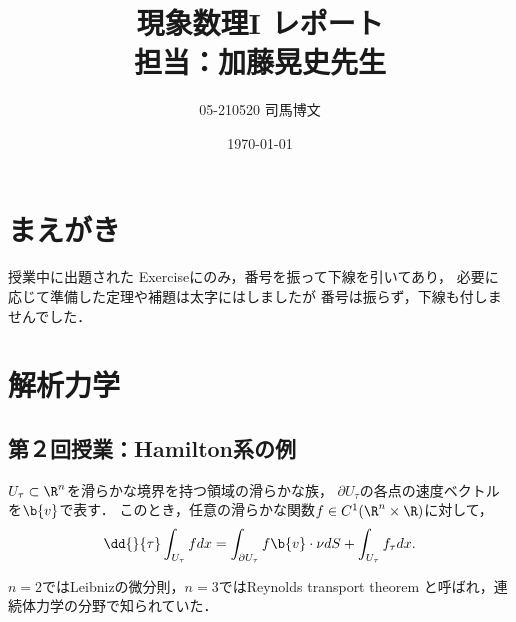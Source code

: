 \documentclass[uplatex,dvipdfmx]{jsarticle}
\title{現象数理I レポート\\担当：加藤晃史先生}\author{05-210520 司馬博文}\date{\today}
\begin{document}
\maketitle

\section*{まえがき}

授業中に出題された
Exerciseにのみ，番号を振って下線を引いてあり，
必要に応じて準備した定理や補題は太字にはしましたが
番号は振らず，下線も付しませんでした．

\section{解析力学}

\subsection{第２回授業：Hamilton系の例}

\begin{theorem*}\label{thm-differentiation-of-integral-on-moving-region}
    $U_\tau\subset\R^n$を滑らかな境界を持つ領域の滑らかな族，
    $\partial U_\tau$の各点の速度ベクトルを$\b{v}$で表す．
    このとき，任意の滑らかな関数$f\in C^1(\R^n\times\R)$に対して，
    \[\dd{}{\tau}\int_{U_\tau}fdx=\int_{\partial U_\tau}f\b{v}\cdot\nu dS+\int_{U_\tau}f_\tau dx.\]
\end{theorem*}
\begin{remark*}
    $n=2$ではLeibnizの微分則，$n=3$ではReynolds transport theorem
    と呼ばれ，連続体力学の分野で知られていた．
\end{remark*}
\end{document}
